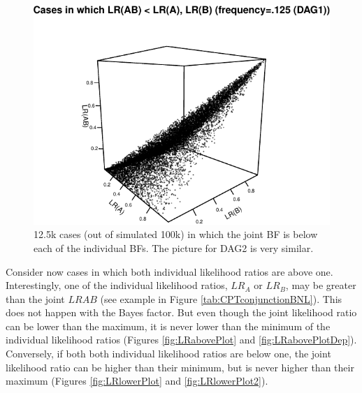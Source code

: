 \documentclass[
  10pt,
  dvipsnames,enabledeprecatedfontcommands]{scrartcl}
\begin{document}
\begin{figure}

\begin{center}\includegraphics[width=1\linewidth]{conjunction-appendix14_files/figure-latex/unnamed-chunk-17-1} \end{center}
\caption{12.5k cases (out of simulated 100k) in which the joint BF is below each of the individual BFs.  The picture for \textsf{DAG2} is very similar.}
\label{fig:LRfails}
\end{figure}

Consider now cases in which both individual likelihood ratios are above
one. Interestingly, one of the individual likelihood ratios, \(LR_A\) or
\(LR_B\), may be greater than the joint \(LR{AB}\) (see example in
Figure \ref{tab:CPTconjunctionBNL}). This does not happen with the Bayes
factor. But even though the joint likelihood ratio can be lower than the
maximum, it is never lower than the minimum of the individual likelihood
ratios (Figures \ref{fig:LRabovePlot} and \ref{fig:LRabovePlotDep}).
Conversely, if both both individual likelihood ratios are below one, the
joint likelihood ratio can be higher than their minimum, but is never
higher than their maximum (Figures \ref{fig:LRlowerPlot} and
\ref{fig:LRlowerPlot2}).

\vspace{1mm}
\footnotesize

\normalsize

\vspace{1mm}
\footnotesize

\normalsize
\end{document}
